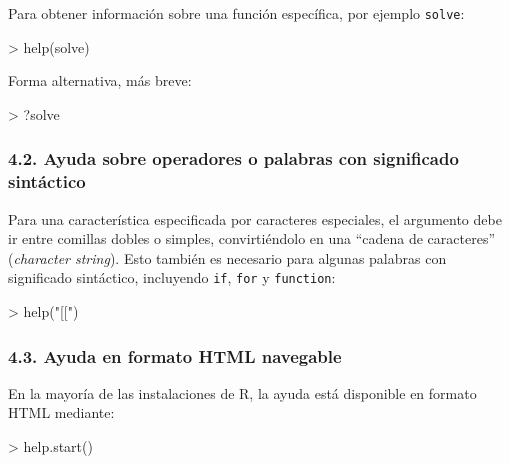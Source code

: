 \documentclass[
  jou,
  floatsintext,
  longtable,
  a4paper,
  nolmodern,
  notxfonts,
  notimes,
  12pt,
  colorlinks=true,linkcolor=blue,citecolor=blue,urlcolor=blue]{apa7}
\newenvironment{Shaded}{\begin{snugshade}}{\end{snugshade}}
\newcommand{\FunctionTok}[1]{\textcolor[rgb]{0.28,0.35,0.67}{#1}}
\newcommand{\NormalTok}[1]{\textcolor[rgb]{0.00,0.23,0.31}{#1}}
\newcommand{\SpecialCharTok}[1]{\textcolor[rgb]{0.37,0.37,0.37}{#1}}
\newcommand{\StringTok}[1]{\textcolor[rgb]{0.13,0.47,0.30}{#1}}
\begin{document}
Para obtener información sobre una función específica, por ejemplo
\texttt{solve}:

\begin{Shaded}
\begin{Highlighting}[]
\SpecialCharTok{\textgreater{}} \FunctionTok{help}\NormalTok{(solve)}
\end{Highlighting}
\end{Shaded}

Forma alternativa, más breve:

\begin{Shaded}
\begin{Highlighting}[]
\SpecialCharTok{\textgreater{}}\NormalTok{ ?solve}
\end{Highlighting}
\end{Shaded}

\subsubsection{4.2. Ayuda sobre operadores o palabras con significado
sintáctico}\label{ayuda-sobre-operadores-o-palabras-con-significado-sintuxe1ctico}

Para una característica especificada por caracteres especiales, el
argumento debe ir entre comillas dobles o simples, convirtiéndolo en una
``cadena de caracteres'' (\emph{character string}). Esto también es
necesario para algunas palabras con significado sintáctico, incluyendo
\texttt{if}, \texttt{for} y \texttt{function}:

\begin{Shaded}
\begin{Highlighting}[]
\SpecialCharTok{\textgreater{}} \FunctionTok{help}\NormalTok{(}\StringTok{"[["}\NormalTok{)}
\end{Highlighting}
\end{Shaded}

\subsubsection{4.3. Ayuda en formato HTML
navegable}\label{ayuda-en-formato-html-navegable}

En la mayoría de las instalaciones de R, la ayuda está disponible en
formato HTML mediante:

\begin{Shaded}
\begin{Highlighting}[]
\SpecialCharTok{\textgreater{}} \FunctionTok{help.start}\NormalTok{()}
\end{Highlighting}
\end{Shaded}
\end{document}
